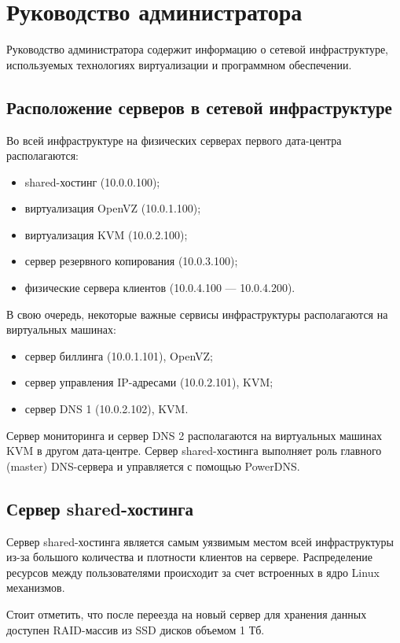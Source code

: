 \section{Руководство администратора}

Руководство администратора содержит информацию о сетевой инфраструктуре, используемых технологиях виртуализации и программном обеспечении.

\subsection{Расположение серверов в сетевой инфраструктуре}
Во всей инфраструктуре на физических серверах первого дата-центра располагаются:
\begin{itemize}
  \item shared-хостинг (10.0.0.100);
  \item виртуализация OpenVZ (10.0.1.100);
  \item виртуализация KVM (10.0.2.100);
  \item сервер резервного копирования (10.0.3.100);
  \item физические сервера клиентов (10.0.4.100 --- 10.0.4.200).
\end{itemize}

В свою очередь, некоторые важные сервисы инфраструктуры располагаются на виртуальных машинах:
\begin{itemize}
  \item сервер биллинга (10.0.1.101), OpenVZ;
  \item сервер управления IP-адресами (10.0.2.101), KVM;
  \item сервер DNS 1 (10.0.2.102), KVM.
\end{itemize}

Сервер мониторинга и сервер DNS 2 располагаются на виртуальных машинах KVM в другом дата-центре.
Сервер shared-хостинга выполняет роль главного (master) DNS-сервера и управляется с помощью PowerDNS.

\subsection{Сервер shared-хостинга}

Сервер shared-хостинга является самым уязвимым местом всей инфраструктуры из-за большого количества и плотности клиентов на сервере.
Распределение ресурсов между пользователями происходит за счет встроенных в ядро Linux механизмов.

Стоит отметить, что после переезда на новый сервер для хранения данных доступен RAID-массив из SSD дисков объемом 1 Тб.

